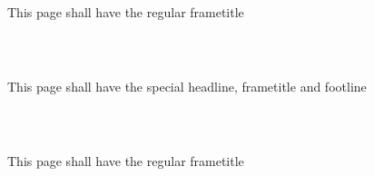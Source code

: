 \documentclass[aspectratio=169]{beamer}
\begin{document}
\begin{frame}
\frametitle{~}
This page shall have the regular frametitle
\end{frame}

\begin{frame}[special]
\frametitle{~}
This page shall have the special headline, frametitle and footline
\end{frame}

\begin{frame}
\frametitle{~}
This page shall have the regular frametitle
\end{frame}
\end{document}
